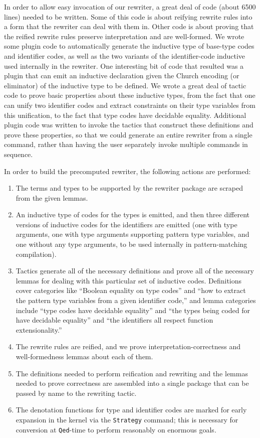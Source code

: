 \begin{subappendices}
In order to allow easy invocation of our rewriter, a great deal of code (about 6500 lines) needed to be written.
Some of this code is about reifying rewrite rules into a form that the rewriter can deal with them in.
Other code is about proving that the reified rewrite rules preserve interpretation and are well-formed.
We wrote some plugin code to automatically generate the inductive type of base-type codes and identifier codes, as well as the two variants of the identifier-code inductive used internally in the rewriter.
One interesting bit of code that resulted was a plugin that can emit an inductive declaration given the Church encoding (or eliminator) of the inductive type to be defined.
We wrote a great deal of tactic code to prove basic properties about these inductive types, from the fact that one can unify two identifier codes and extract constraints on their type variables from this unification, to the fact that type codes have decidable equality.
Additional plugin code was written to invoke the tactics that construct these definitions and prove these properties, so that we could generate an entire rewriter from a single command, rather than having the user separately invoke multiple commands in sequence.

In order to build the precomputed rewriter, the following actions are performed:
\begin{enumerate}
    \item
    The terms and types to be supported by the rewriter package are scraped from the given lemmas.
    \item
    An inductive type of codes for the types is emitted, and then three different versions of inductive codes for the identifiers are emitted (one with type arguments, one with type arguments supporting pattern type variables, and one without any type arguments, to be used internally in pattern-matching compilation).
    \item
    Tactics generate all of the necessary definitions and prove all of the necessary lemmas for dealing with this particular set of inductive codes.
    Definitions cover categories like ``Boolean equality on type codes'' and ``how to extract the pattern type variables from a given identifier code,'' and lemma categories include ``type codes have decidable equality'' and ``the types being coded for have decidable equality'' and ``the identifiers all respect function extensionality.''
    \item
    The rewrite rules are reified, and we prove interpretation-correctness and well-formedness lemmas about each of them.
    \item
    The definitions needed to perform reification and rewriting and the lemmas needed to prove correctness are assembled into a single package that can be passed by name to the rewriting tactic.
    \item
    The denotation functions for type and identifier codes are marked for early expansion in the kernel via the \texttt{Strategy} command;
    this is necessary for conversion at \texttt{Qed}-time to perform reasonably on enormous goals.
\end{enumerate}


\end{subappendices}
